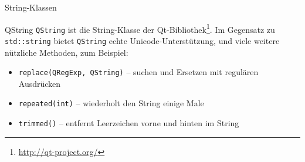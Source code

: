 \begin{frame}{String-Klassen}
    \begin{block}{QString}
    \texttt{QString} ist die String-Klasse der Qt-Bibliothek\footnote{\url{http://qt-project.org/}}. Im Gegensatz zu \texttt{std::string} bietet \texttt{QString} echte Unicode-Unterstützung, und viele weitere nützliche Methoden, zum Beispiel:
    \begin{itemize}
    \item \texttt{replace(QRegExp, QString)} -- suchen und Ersetzen mit regulären Ausdrücken
    \item \texttt{repeated(int)} -- wiederholt den String einige Male
    \item \texttt{trimmed()} -- entfernt Leerzeichen vorne und hinten im String
    \end{itemize}
    \end{block}
\end{frame}